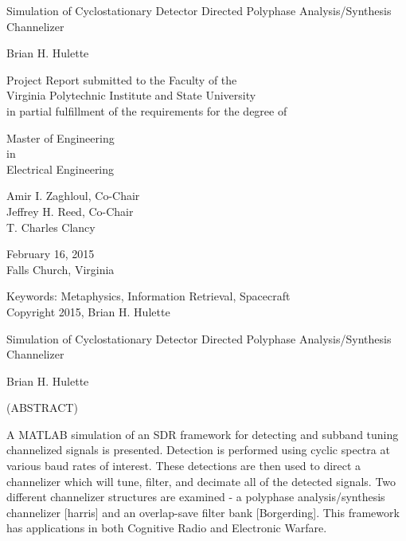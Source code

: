 \documentclass[12pt,dvips]{report}
\begin{document}
\thispagestyle{empty}
\begin{center}

{\Large 
Simulation of Cyclostationary Detector
Directed Polyphase Analysis/Synthesis Channelizer
}

\vfill

Brian H. Hulette

\vfill

Project Report submitted to the Faculty of the \\
Virginia Polytechnic Institute and State University \\
in partial fulfillment of the requirements for the degree of

\vfill

Master of Engineering \\
in \\
Electrical Engineering

\vfill

Amir I. Zaghloul, Co-Chair \\
Jeffrey H. Reed, Co-Chair \\
T. Charles Clancy

\vfill

February 16, 2015 \\
Falls Church, Virginia

\vfill

Keywords: Metaphysics, Information Retrieval, Spacecraft
\\
Copyright 2015, Brian H. Hulette

\end{center}

\pagebreak

\thispagestyle{empty}
\begin{center}

{\large Simulation of Cyclostationary Detector
Directed Polyphase Analysis/Synthesis Channelizer}

\vfill

Brian H. Hulette

\vfill

(ABSTRACT)

\vfill

\end{center}

A MATLAB simulation of an SDR framework for detecting and subband tuning
channelized signals is presented.  Detection is performed using cyclic spectra
at various baud rates of interest.  These detections are then used to direct a
channelizer which will tune, filter, and decimate all of the detected signals.
Two different channelizer structures are examined - a polyphase
analysis/synthesis channelizer [harris] and an overlap-save filter bank
[Borgerding]. This framework has applications in both Cognitive Radio and
Electronic Warfare.
\end{document}
